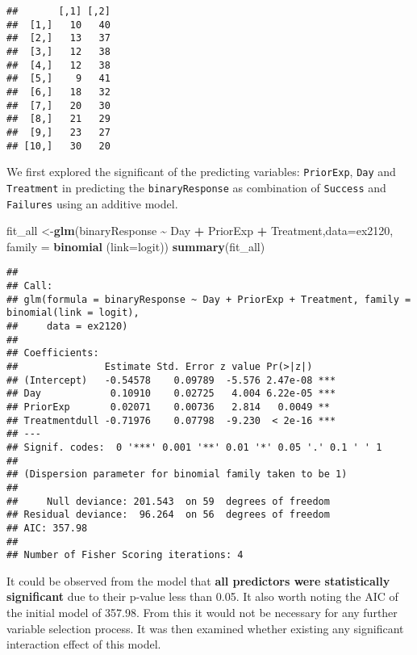 \documentclass[
]{article}
\newenvironment{Shaded}{\begin{snugshade}}{\end{snugshade}}
\newcommand{\AttributeTok}[1]{\textcolor[rgb]{0.13,0.29,0.53}{#1}}
\newcommand{\FunctionTok}[1]{\textcolor[rgb]{0.13,0.29,0.53}{\textbf{#1}}}
\newcommand{\NormalTok}[1]{#1}
\newcommand{\OtherTok}[1]{\textcolor[rgb]{0.56,0.35,0.01}{#1}}
\newcommand{\SpecialCharTok}[1]{\textcolor[rgb]{0.81,0.36,0.00}{\textbf{#1}}}
\begin{document}
\begin{verbatim}
##       [,1] [,2]
##  [1,]   10   40
##  [2,]   13   37
##  [3,]   12   38
##  [4,]   12   38
##  [5,]    9   41
##  [6,]   18   32
##  [7,]   20   30
##  [8,]   21   29
##  [9,]   23   27
## [10,]   30   20
\end{verbatim}

We first explored the significant of the predicting variables:
\texttt{PriorExp}, \texttt{Day} and \texttt{Treatment} in predicting the
\texttt{binaryResponse} as combination of \texttt{Success} and
\texttt{Failures} using an additive model.

\begin{Shaded}
\begin{Highlighting}[]
\NormalTok{fit\_all }\OtherTok{\textless{}{-}}\FunctionTok{glm}\NormalTok{(binaryResponse }\SpecialCharTok{\textasciitilde{}}\NormalTok{ Day }\SpecialCharTok{+}\NormalTok{ PriorExp }\SpecialCharTok{+}\NormalTok{ Treatment,}\AttributeTok{data=}\NormalTok{ex2120, }\AttributeTok{family =} \FunctionTok{binomial}\NormalTok{ (}\AttributeTok{link=}\NormalTok{logit))}
\FunctionTok{summary}\NormalTok{(fit\_all)}
\end{Highlighting}
\end{Shaded}

\begin{verbatim}
## 
## Call:
## glm(formula = binaryResponse ~ Day + PriorExp + Treatment, family = binomial(link = logit), 
##     data = ex2120)
## 
## Coefficients:
##               Estimate Std. Error z value Pr(>|z|)    
## (Intercept)   -0.54578    0.09789  -5.576 2.47e-08 ***
## Day            0.10910    0.02725   4.004 6.22e-05 ***
## PriorExp       0.02071    0.00736   2.814   0.0049 ** 
## Treatmentdull -0.71976    0.07798  -9.230  < 2e-16 ***
## ---
## Signif. codes:  0 '***' 0.001 '**' 0.01 '*' 0.05 '.' 0.1 ' ' 1
## 
## (Dispersion parameter for binomial family taken to be 1)
## 
##     Null deviance: 201.543  on 59  degrees of freedom
## Residual deviance:  96.264  on 56  degrees of freedom
## AIC: 357.98
## 
## Number of Fisher Scoring iterations: 4
\end{verbatim}

It could be observed from the model that \textbf{all predictors were
statistically significant} due to their p-value less than 0.05. It also
worth noting the AIC of the initial model of 357.98. From this it would
not be necessary for any further variable selection process. It was then
examined whether existing any significant interaction effect of this
model.
\end{document}
